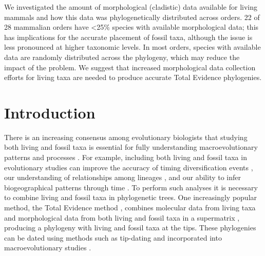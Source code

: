 We investigated the amount of morphological (cladistic) data available for living mammals and how this data was phylogenetically distributed across orders.
22 of 28 mammalian orders have \textless 25\% species with available morphological data; this has implications for the accurate placement of fossil taxa, although the issue is less pronounced at higher taxonomic levels. 
In most orders, species with available data are randomly distributed across the phylogeny, which may reduce the impact of the problem.
We suggest that increased morphological data collection efforts for living taxa are needed to produce accurate Total Evidence phylogenies. 


\newpage

%
%
\newpage 
\section{Introduction}
There is an increasing consensus among evolutionary biologists that studying both living and fossil taxa is essential for fully understanding macroevolutionary patterns and processes \citep{slaterunifying2013,fritzdiversity2013,Wood01032013}.
For example, including both living and fossil taxa in evolutionary studies can improve the accuracy of timing diversification events \citep[e.g.][]{ronquista2012}, our understanding of relationships among lineages \citep[e.g.][]{beckancient2014}, and our ability to infer biogeographical patterns through time \citep[e.g.][]{Meseguer01032015}.
To perform such analyses it is necessary to combine living and fossil taxa in phylogenetic trees.
One increasingly popular method, the Total Evidence method \citep{eernissetaxonomic1993,ronquista2012}, combines molecular data from living taxa and morphological data from both living and fossil taxa in a supermatrix \citep[e.g.][]{pyrondivergence2011,ronquista2012,schragocombining2013,slaterunifying2013,beckancient2014,Meseguer01032015}, producing a phylogeny with living and fossil taxa at the tips. 
These phylogenies can be dated using methods such as tip-dating \citep{ronquista2012,Wood01032013} and incorporated into macroevolutionary studies \citep[e.g.][]{ronquista2012,Wood01032013,slaterphylogenetic2013}.

